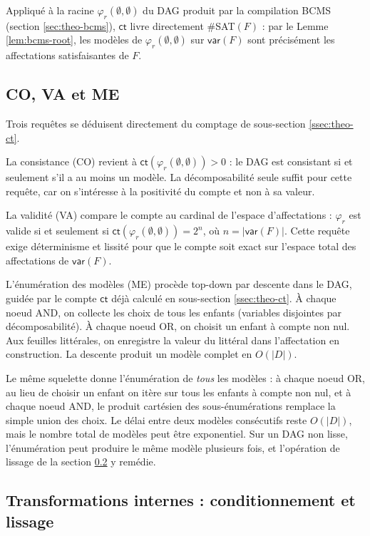 \documentclass[11pt,a4paper]{report}
\theoremstyle{plain}
\theoremstyle{definition}
\begin{document}
Appliqué à la racine $\varphi_r(\emptyset, \emptyset)$ du DAG produit
par la compilation BCMS (section \ref{sec:theo-bcms}), $\mathsf{ct}$
livre directement \#SAT$(F)$ : par le Lemme \ref{lem:bcms-root}, les
modèles de $\varphi_r(\emptyset, \emptyset)$ sur $\mathsf{var}(F)$ sont
précisément les affectations satisfaisantes de $F$.

\subsection{CO, VA et ME}
\label{ssec:theo-co-va-me1}

Trois requêtes se déduisent directement du comptage de
sous-section \ref{ssec:theo-ct}.

La consistance (CO) revient à
$\mathsf{ct}(\varphi_r(\emptyset, \emptyset)) > 0$ : le DAG est
consistant si et seulement s'il a au moins un modèle. La décomposabilité
seule suffit pour cette requête, car on s'intéresse à la positivité du
compte et non à sa valeur.

La validité (VA) compare le compte au cardinal de l'espace
d'affectations : $\varphi_r$ est valide si et seulement si
$\mathsf{ct}(\varphi_r(\emptyset, \emptyset)) = 2^n$, où
$n = |\mathsf{var}(F)|$. Cette requête exige déterminisme et lissité
pour que le compte soit exact sur l'espace total des affectations de
$\mathsf{var}(F)$.

L'énumération des modèles (ME) procède top-down par descente dans le
DAG, guidée par le compte $\mathsf{ct}$ déjà calculé en
sous-section \ref{ssec:theo-ct}. À chaque noeud AND, on collecte les
choix de tous les enfants (variables disjointes par décomposabilité).
À chaque noeud OR, on choisit un enfant à compte non nul. Aux feuilles
littérales, on enregistre la valeur du littéral dans l'affectation en
construction. La descente produit un modèle complet en $O(|D|)$.

Le même squelette donne l'énumération de \emph{tous} les modèles : à
chaque noeud OR, au lieu de choisir un enfant on itère sur tous les
enfants à compte non nul, et à chaque noeud AND, le produit cartésien
des sous-énumérations remplace la simple union des choix. Le délai entre
deux modèles consécutifs reste $O(|D|)$, mais le nombre total de
modèles peut être exponentiel. Sur un DAG non lisse, l'énumération
peut produire le même modèle plusieurs fois, et l'opération de
lissage de la section \ref{ssec:theo-trans} y remédie.

\subsection{Transformations internes : conditionnement et lissage}
\label{ssec:theo-trans}
\end{document}
